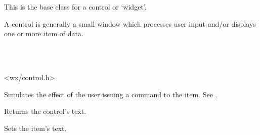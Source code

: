 \section{}\label{wxcontrol}

This is the base class for a control or `widget'.

A control is generally a small window which processes user input and/or displays one or more item
of data.


\\
\\


<wx/control.h>




\label{wxcontrolcommand}


Simulates the effect of the user issuing a command to the item. See .

\label{wxcontrolgetlabel}


Returns the control's text.

\label{wxcontrolsetlabel}


Sets the item's text.

